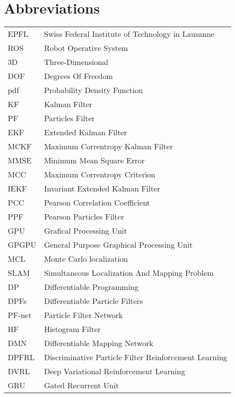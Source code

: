 \section{Abbreviations}
\begin{flushleft}
\begin{tabular}{l l}
EPFL & Swiss Federal Institute of Technology in Lausanne\\
ROS & Robot Operative System\\
3D & Three-Dimensional\\
DOF & Degrees Of Freedom\\
pdf & Probability Density Function\\
KF & Kalman Filter\\
PF & Particles Filter\\
EKF & Extended Kalman Filter\\
MCKF & Maximum Correntropy Kalman Filter\\
MMSE & Minimum Mean Square Error\\
MCC & Maximum Correntropy Criterion\\
IEKF & Invariant Extended Kalman Filter\\
PCC & Pearson Correlation Coefficient\\
PPF & Pearson Particles Filter\\
GPU & Grafical Processing Unit\\
GPGPU & General Purpose Graphical Processing Unit\\
MCL & Monte Carlo localization\\
SLAM & Simultaneous Localization And Mapping Problem\\
DP & Differentiable Programming\\
DPFs & Differentiable Particle Filters\\
PF-net & Particle Filter Network\\
HF & Histogram Filter\\
DMN & Differentiable Mapping Network\\
DPFRL & Discriminative Particle Filter Reinforcement Learning\\
DVRL & Deep Variational Reinforcement Learning \\
GRU & Gated Recurrent Unit \\

\end{tabular}
\end{flushleft}

